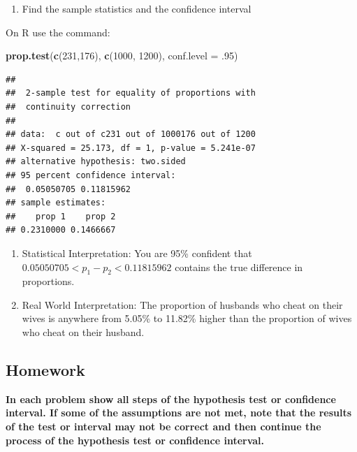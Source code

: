 \documentclass[
]{book}
\newenvironment{Shaded}{\begin{snugshade}}{\end{snugshade}}
\newcommand{\DataTypeTok}[1]{\textcolor[rgb]{0.13,0.29,0.53}{#1}}
\newcommand{\DecValTok}[1]{\textcolor[rgb]{0.00,0.00,0.81}{#1}}
\newcommand{\FloatTok}[1]{\textcolor[rgb]{0.00,0.00,0.81}{#1}}
\newcommand{\KeywordTok}[1]{\textcolor[rgb]{0.13,0.29,0.53}{\textbf{#1}}}
\newcommand{\NormalTok}[1]{#1}
\providecommand{\tightlist}{%
  \setlength{\itemsep}{0pt}\setlength{\parskip}{0pt}}
\begin{document}
\begin{enumerate}
\def\labelenumi{\arabic{enumi}.}
\setcounter{enumi}{2}
\tightlist
\item
  Find the sample statistics and the confidence interval
\end{enumerate}

On R use the command:

\begin{Shaded}
\begin{Highlighting}[]
\KeywordTok{prop.test}\NormalTok{(}\KeywordTok{c}\NormalTok{(}\DecValTok{231}\NormalTok{,}\DecValTok{176}\NormalTok{), }\KeywordTok{c}\NormalTok{(}\DecValTok{1000}\NormalTok{, }\DecValTok{1200}\NormalTok{), }\DataTypeTok{conf.level =} \FloatTok{.95}\NormalTok{)}
\end{Highlighting}
\end{Shaded}

\begin{verbatim}
## 
##  2-sample test for equality of proportions with
##  continuity correction
## 
## data:  c out of c231 out of 1000176 out of 1200
## X-squared = 25.173, df = 1, p-value = 5.241e-07
## alternative hypothesis: two.sided
## 95 percent confidence interval:
##  0.05050705 0.11815962
## sample estimates:
##    prop 1    prop 2 
## 0.2310000 0.1466667
\end{verbatim}

\begin{enumerate}
\def\labelenumi{\arabic{enumi}.}
\setcounter{enumi}{3}
\item
  Statistical Interpretation: You are 95\% confident that \(0.05050705<p_1-p_2<0.11815962\) contains the true difference in proportions.
\item
  Real World Interpretation: The proportion of husbands who cheat on their wives is anywhere from 5.05\% to 11.82\% higher than the proportion of wives who cheat on their husband.
\end{enumerate}

\hypertarget{homework-22}{%
\subsection{Homework}\label{homework-22}}

\textbf{In each problem show all steps of the hypothesis test or confidence interval. If some of the assumptions are not met, note that the results of the test or interval may not be correct and then continue the process of the hypothesis test or confidence interval.}
\end{document}
